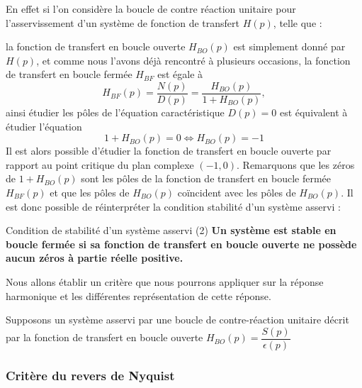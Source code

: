 En effet si l'on considère la boucle de contre réaction unitaire pour l'asservissement d'un système
de fonction de transfert $H(p)$, telle que : 
\begin{center}
\end{center}

la fonction de transfert en boucle ouverte $H_{BO}(p)$ est simplement donné par $H(p)$, et comme nous l'avons 
déjà rencontré à plusieurs occasions, la fonction de transfert en boucle fermée $H_{BF}$ est égale à 
$$
H_{BF}(p)=\dfrac{N(p)}{D(p)}=\dfrac{H_{BO}(p)}{1+H_{BO}(p)},
$$
ainsi étudier les pôles de l'équation caractéristique $D(p)=0$ est équivalent à étudier l'équation 
$$
1+H_{BO}(p)=0\Leftrightarrow H_{BO}(p)=-1
$$
Il est alors possible d'étudier la fonction de transfert en boucle ouverte par rapport au point critique du plan complexe 
$(-1,0)$.
Remarquons que les zéros de $1+H_{BO}(p)$ sont les pôles de la fonction de transfert en boucle fermée $H_{BF}(p)$ et
que les pôles de $H_{BO}(p)$ co\"incident avec les pôles de $H_{BO}(p)$.
Il est donc possible de réinterpréter la condition stabilité d'un système asservi :

\begin{criteria}{Condition de stabilité d'un système asservi (2)}
    \textbf{Un système est stable en boucle fermée si sa fonction de transfert en boucle ouverte ne possède aucun 
    \textbf{zéros} à partie réelle positive.}
\end{criteria}

Nous allons établir un critère que nous pourrons appliquer sur la réponse harmonique et les différentes représentation
de cette réponse.

    Supposons un système asservi par une boucle de contre-réaction unitaire
décrit par la fonction de transfert en boucle ouverte $H_{BO}(p)=\dfrac{S(p)}{\epsilon(p)}$


\subsubsection{Critère du revers de Nyquist}

